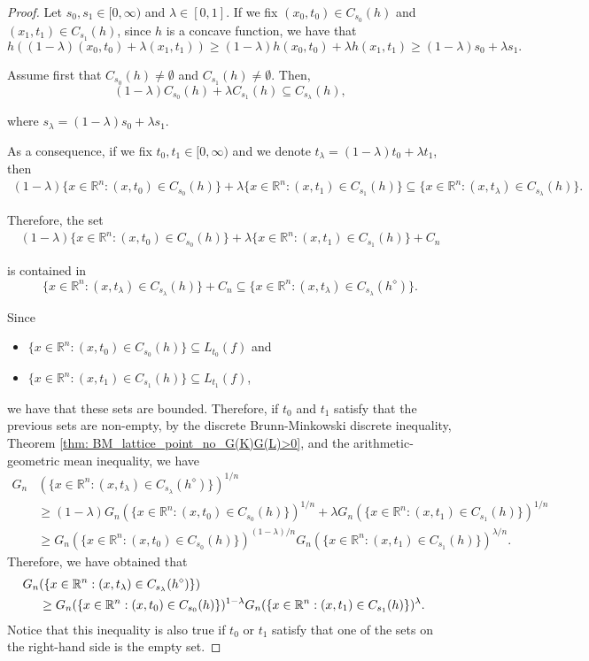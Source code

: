 \documentclass{amsart}
\newcommand{\R}{\mathbb R}
\theoremstyle{remark}
\theoremstyle{definition}
\numberwithin{equation}{section}
\begin{document}
\begin{proof}
Let $s_0, s_1 \in [0, \infty)$ and $\lambda \in [0,1]$. If we fix $(x_0, t_0) \in C_{s_0}(h)$ and $(x_1, t_1) \in C_{s_1}(h)$, since $h$ is a concave function, we have that
\[
h((1-\lambda)(x_0,t_0) + \lambda (x_1,t_1)) \geq (1-\lambda) h(x_0,t_0) + \lambda h(x_1,t_1) \geq (1-\lambda) s_0 + \lambda s_1.
\]

Assume first that $C_{s_0}(h) \neq \emptyset$ and $C_{s_1}(h) \neq \emptyset$. Then,
\[
(1-\lambda)C_{s_0}(h) + \lambda C_{s_1}(h) \subseteq C_{s_{\lambda}}(h),
\]

where $s_{\lambda}=(1-\lambda)s_0 + \lambda s_1$.

As a consequence, if we fix $t_0, t_1 \in [0,\infty)$ and we denote $t_{\lambda}=(1-\lambda) t_0 + \lambda t_1$, then
\begin{align*}
(1-\lambda)\{ x \in \R^n : (x,t_0) \in C_{s_0}(h) \} + \lambda \{ x \in \R^n : (x,t_1) \in C_{s_1}(h) \} \subseteq \{ x \in \R^n : (x, t_{\lambda}) \in C_{s_{\lambda}}(h)  \}.
\end{align*}

Therefore, the set
\begin{align*}
(1-\lambda) \{ x \in \R^n : (x,t_0) \in C_{s_0}(h) \} + \lambda \{ x \in \R^n : (x,t_1) \in C_{s_1}(h) \} + C_n
\end{align*}

is contained in
\[
\{ x \in \R^n : (x, t_{\lambda}) \in C_{s_{\lambda}}(h)  \} + C_n \subseteq \{ x \in \R^n : (x, t_{\lambda}) \in C_{s_{\lambda}}(h^{\diamond})  \} .
\]

Since
\begin{itemize}
\item $\{ x \in \R^n : (x,t_0) \in C_{s_0}(h) \}\subseteq L_{t_0}(f)$ and
\item $\{ x \in \R^n : (x,t_1) \in C_{s_1}(h) \}\subseteq L_{t_1}(f)$,
\end{itemize}
we have that these sets are bounded. Therefore, if $t_0$ and $t_1$ satisfy that the previous sets are non-empty, by the discrete Brunn-Minkowski discrete inequality, Theorem \ref{thm: BM_lattice_point_no_G(K)G(L)>0}, and the arithmetic-geometric mean inequality, we have
\begin{align*}
G_n&(\{ x \in \R^n : (x, t_{\lambda}) \in C_{s_{\lambda}}(h^{\diamond}) \})^{1/n} \\
&\geq (1-\lambda) G_n(\{ x \in \R^n : (x,t_0) \in C_{s_0}(h) \} )^{1/n} +\lambda G_n( \{ x \in \R^n : (x,t_1) \in C_{s_1}(h) \} )^{1/n} \\
& \geq G_n(\{ x \in \R^n : (x,t_0) \in C_{s_0}(h) \} )^{(1-\lambda)/n} G_n( \{ x \in \R^n : (x,t_1) \in C_{s_1}(h) \} )^{\lambda/n}.
\end{align*}
Therefore, we have obtained that
\begin{align} \label{eq:BM}
G_n&(\{ x \in \R^n : (x, t_{\lambda}) \in C_{s_{\lambda}}(h^{\diamond}) \}) \cr
& \geq G_n(\{ x \in \R^n : (x,t_0) \in C_{s_0}(h) \} )^{1-\lambda} G_n( \{ x \in \R^n : (x,t_1) \in C_{s_1}(h) \} )^{\lambda}.
\end{align}
Notice that this inequality is also true if $t_0$ or $t_1$ satisfy that one of the sets on the right-hand side is the empty set.


\end{proof}
\end{document}
